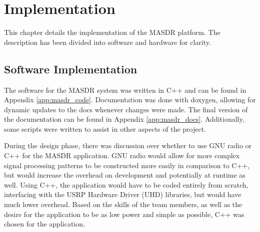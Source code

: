 \chapter{Implementation}

This chapter details the implementation of the MASDR platform. The description has been divided into software and hardware for clarity.

\section{Software Implementation} \label{impl:rotate} \label{impl:tx_messages}
The software for the MASDR system was written in C++ and can be found in Appendix \ref{app:masdr_code}. Documentation was done with doxygen, allowing for dynamic updates to the docs whenever changes were made. The final version of the documentation can be found in Appendix \ref{app:masdr_docs}. Additionally, some scripts were written to assist in other aspects of the project. \par

During the design phase, there was discussion over whether to use GNU radio or C++ for the MASDR application. GNU radio would allow for more complex signal processing patterns to be constructed more easily in comparison to C++, but would increase the overhead on development and potentially at runtime as well. Using C++, the application would have to be coded entirely from scratch, interfacing with the USRP Hardware Driver (UHD) libraries, but would have much lower overhead. Based on the skills of the team members, as well as the desire for the application to be as low power and simple as possible, C++ was chosen for the application. \par

